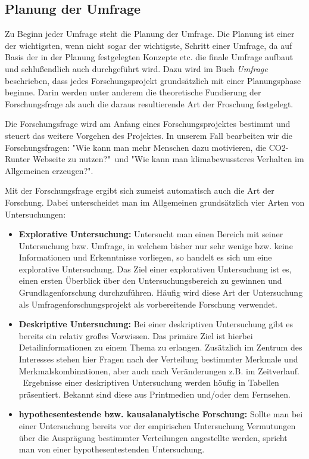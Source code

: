 \subsection{Planung der Umfrage}
Zu Beginn jeder Umfrage steht die Planung der Umfrage.
Die Planung ist einer der wichtigsten, wenn nicht sogar der wichtigste, Schritt einer Umfrage, da auf Basis der in der Planung festgelegten Konzepte etc.
die finale Umfrage aufbaut und schlußendlich auch durchgeführt wird.
Dazu wird im Buch \textit{Umfrage} beschrieben, dass jedes Forschungsprojekt grundsätzlich mit einer Planungsphase beginne.
Darin werden unter anderem die theoretische Fundierung der Forschungsfrage als auch die daraus resultierende Art der Froschung festgelegt.\cite{umfrage:2011}

Die Forschungsfrage wird am Anfang eines Forschungsprojektes bestimmt und steuert das weitere Vorgehen des Projektes. \cite{umfrage:2011}
In unserem Fall bearbeiten wir die Forschungsfragen: "Wie kann man mehr Menschen dazu motivieren, die CO2-Runter Webseite zu nutzen?"\ und "Wie kann man klimabewussteres Verhalten im Allgemeinen erzeugen?".

Mit der Forschungsfrage ergibt sich zumeist automatisch auch die Art der Forschung.
Dabei unterscheidet man im Allgemeinen grundsätzlich vier Arten von Untersuchungen:

\begin{itemize}
    \item \textbf{Explorative Untersuchung:} Untersucht man einen Bereich mit seiner Untersuchung bzw. Umfrage, in welchem bisher nur sehr wenige bzw. keine Informationen und Erkenntnisse vorliegen, so handelt es sich um eine explorative Untersuchung. Das Ziel einer explorativen Untersuchung ist es, einen ersten Überblick über den Untersuchungsbereich zu gewinnen und Grundlagenforschung durchzuführen. Häufig wird diese Art der Untersuchung als Umfragenforschungsprojekt als vorbereitende Forschung verwendet. \cite{umfrage:2011}
    \item \textbf{Deskriptive Untersuchung:} Bei einer deskriptiven Untersuchung gibt es bereits ein relativ großes Vorwissen. Das primäre Ziel ist hierbei Detailinformationen zu einem Thema zu erlangen. Zusätzlich im Zentrum des Interesses stehen hier Fragen nach der Verteilung bestimmter Merkmale und Merkmalskombinationen, aber auch nach Veränderungen z.B. im Zeitverlauf. \cite{umfrage:2011}\ Ergebnisse einer deskriptiven Untersuchung werden höufig in Tabellen präsentiert. Bekannt sind diese aus Printmedien und/oder dem Fernsehen.\cite{umfrage:2011}
    \item \textbf{hypothesentestende bzw. kausalanalytische Forschung:} Sollte man bei einer Untersuchung bereits vor der empirischen Untersuchung Vermutungen über die Ausprägung bestimmter Verteilungen angestellte werden, spricht man von einer hypothesentestenden Untersuchung.\cite{umfrage:2011}
\end{itemize}

